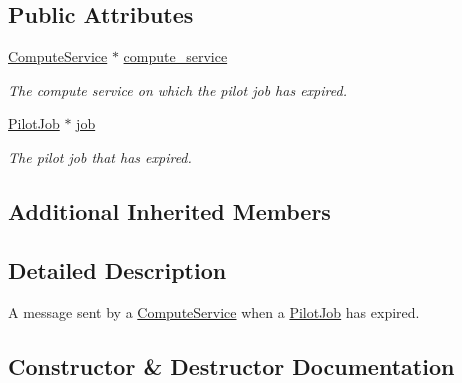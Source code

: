 \subsection*{Public Attributes}
\begin{DoxyCompactItemize}
\item 
\mbox{\label{classwrench_1_1_compute_service_pilot_job_expired_message_ae888883b9dd98612926ef70a3815ad1f}} 
\hyperlink{classwrench_1_1_compute_service}{Compute\+Service} $\ast$ \hyperlink{classwrench_1_1_compute_service_pilot_job_expired_message_ae888883b9dd98612926ef70a3815ad1f}{compute\+\_\+service}
\begin{DoxyCompactList}\small\item\em The compute service on which the pilot job has expired. \end{DoxyCompactList}\item 
\mbox{\label{classwrench_1_1_compute_service_pilot_job_expired_message_a6eec9848f1f34b76a263c8a0d108c87a}} 
\hyperlink{classwrench_1_1_pilot_job}{Pilot\+Job} $\ast$ \hyperlink{classwrench_1_1_compute_service_pilot_job_expired_message_a6eec9848f1f34b76a263c8a0d108c87a}{job}
\begin{DoxyCompactList}\small\item\em The pilot job that has expired. \end{DoxyCompactList}\end{DoxyCompactItemize}
\subsection*{Additional Inherited Members}


\subsection{Detailed Description}
A message sent by a \hyperlink{classwrench_1_1_compute_service}{Compute\+Service} when a \hyperlink{classwrench_1_1_pilot_job}{Pilot\+Job} has expired. 

\subsection{Constructor \& Destructor Documentation}
\mbox{\label{classwrench_1_1_compute_service_pilot_job_expired_message_afb2106c55a057f9011ed6da588da15d7}} 

